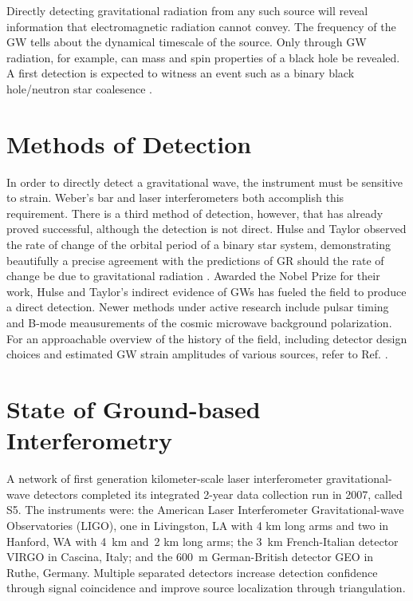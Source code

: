 Directly detecting gravitational radiation from any such source will
reveal information that electromagnetic radiation cannot convey. The
frequency of the GW tells about the dynamical timescale of the
source. Only through GW radiation, for example, can mass and spin
properties of a black hole be revealed. A first detection is expected
to witness an event such as a binary black hole/neutron star
coalesence \cite{Abadie2010Predictions}.





\section{Methods of Detection}
In order to directly detect a gravitational wave, the instrument must
be sensitive to strain. Weber's bar and laser interferometers both
accomplish this requirement. There is a third method of detection,
however, that has already proved successful, although the detection is
not direct. Hulse and Taylor observed the rate of change of the
orbital period of a binary star system, demonstrating beautifully a
precise agreement with the predictions of GR should the rate of change
be due to gravitational radiation \cite{Hulse1975Discovery,
  Weisberg2005Relativistic}. Awarded the Nobel Prize for their work,
Hulse and Taylor's indirect evidence of GWs has fueled the field to
produce a direct detection. Newer methods under active research
include pulsar timing \cite{Hobbs2009International} and B-mode
meausurements of the cosmic microwave background polarization. For an
approachable overview of the history of the field, including detector
design choices and estimated GW strain amplitudes of various sources,
refer to Ref. \cite{Linsay1983Study}.






\section{State of Ground-based Interferometry}
A network of first generation kilometer-scale laser interferometer
gravitational-wave detectors completed its integrated 2-year data
collection run in 2007, called S5. The instruments were: the American
Laser Interferometer Gravitational-wave Observatories (LIGO)\cite{Abbott2009LIGO},
one in Livingston, LA with 4 km long arms and two in Hanford, WA with
4~km and~2 km long arms; the 3~km French-Italian detector
VIRGO\cite{Acernese2008Virgo} in Cascina, Italy; and the 600~m
German-British detector GEO\cite{Luck2006Status} in Ruthe, Germany. Multiple
separated detectors increase detection confidence through signal
coincidence and improve source localization through triangulation.

